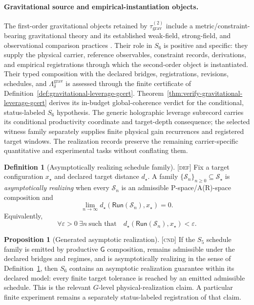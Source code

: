 \documentclass[11pt]{article}
\newcommand{\GOp}{\ensuremath{\mathsf{G}}}
\newcommand{\Defn}{\textsc{[def]}}
\newcommand{\Cnd}{\textsc{[cnd]}}
\theoremstyle{definition}
\newtheorem{sdefinition}{Definition}
\newtheorem{sproposition}{Proposition}
\begin{document}
\paragraph{Gravitational source and empirical-instantiation objects.}
The first-order gravitational objects retained by $\tau_{\mathrm{grav}}^{(2)}$
include a metric/constraint-bearing gravitational theory and its established
weak-field, strong-field, and observational comparison practices
\cite{S_Einstein1916,S_Will2014,S_Berti2015}. Their role in $S_6$ is positive and
specific: they supply the physical carrier, reference observables, constraint
records, derivations, and empirical registrations through which the second-order
object is instantiated. Their typed composition with the declared bridges,
registrations, revisions, schedules, and
$\Lambda^{\mathrm{grav}}_\delta$ is assessed through the finite certificate of
Definition~\ref{def:gravitational-leverage-gcert}. Theorem~\ref{thm:verify-gravitational-leverage-gcert}
derives its in-budget global-coherence verdict for the conditional, status-labeled
$S_6$ hypothesis. The generic holographic leverage subrecord carries its
conditional productivity coordinate and target-depth consequence; the selected
witness family separately supplies finite physical gain recurrences and registered
target windows. The realization records preserve the remaining carrier-specific
quantitative and experimental tasks without conflating them.

\begin{sdefinition}[Asymptotically realizing schedule family]
\label{def:asymptotically-realizing-schedule-family}
\Defn{} Fix a target configuration $x_\star$ and declared target distance
$d_\star$. A family $\{\mathcal S_n\}_{n\geq 0}\subseteq\mathcal S_{\star}$ is
\emph{asymptotically realizing} when every $\mathcal S_n$ is an admissible
P-space/A(R)-space composition and
\begin{equation}
\lim_{n\rightarrow\infty}d_\star\!\left(
\mathsf{Run}(\mathcal S_n),x_\star\right)=0.
\label{eq:asymptotic-target-realization}
\end{equation}
Equivalently,
\begin{equation}
\forall\varepsilon>0\ \exists n\ \text{such that}\quad
 d_\star\!\left(\mathsf{Run}(\mathcal S_n),x_\star\right)<\varepsilon.
\label{eq:epsilon-asymptotic-target-realization}
\end{equation}
\end{sdefinition}

\begin{sproposition}[Generated asymptotic realization]
\label{prop:generated-asymptotic-realization}
\Cnd{} If the $S_5$ schedule family is emitted by productive $\GOp$ composition,
remains admissible under the declared bridges and regimes, and is asymptotically
realizing in the sense of Definition~\ref{def:asymptotically-realizing-schedule-family},
then $S_6$ contains an asymptotic realization guarantee within its declared model:
every finite target tolerance is reached by an emitted admissible schedule. This is
the relevant $G$-level physical-realization claim. A particular finite experiment
remains a separately status-labeled registration of that claim.
\end{sproposition}
\end{document}
